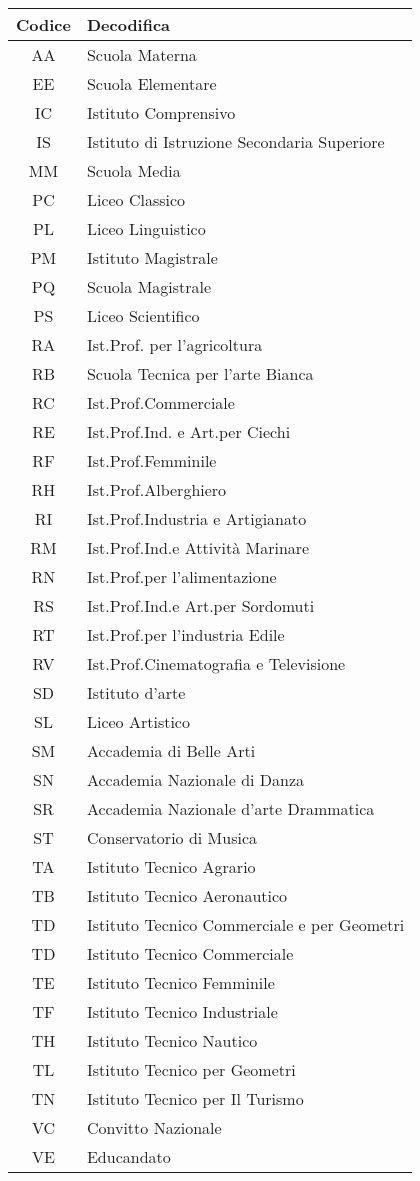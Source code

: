 \begin{center}
	\begin{tabular}{cl}
\toprule
Codice&Decodifica\\
\midrule
AA&Scuola Materna\\
EE&Scuola Elementare\\
IC&Istituto Comprensivo\\
IS&Istituto di Istruzione Secondaria Superiore\\
MM&Scuola Media\\
PC& Liceo Classico\\
PL&Liceo Linguistico\\
PM&Istituto Magistrale\\
PQ&Scuola Magistrale\\
PS& Liceo Scientifico\\
RA&Ist.Prof. per l'agricoltura\\
RB&Scuola Tecnica per l'arte Bianca\\
RC&Ist.Prof.Commerciale\\
RE&Ist.Prof.Ind. e Art.per Ciechi\\
RF&Ist.Prof.Femminile\\
RH&Ist.Prof.Alberghiero\\
RI&Ist.Prof.Industria e Artigianato\\
RM&Ist.Prof.Ind.e Attività Marinare\\
RN&Ist.Prof.per l'alimentazione\\
RS&Ist.Prof.Ind.e Art.per Sordomuti\\
RT&Ist.Prof.per l'industria Edile\\
RV&Ist.Prof.Cinematografia e Televisione\\
SD&Istituto d'arte\\
SL&Liceo Artistico\\
SM&Accademia di Belle Arti\\
SN&Accademia Nazionale di Danza\\
SR&Accademia Nazionale d'arte Drammatica\\
ST&Conservatorio di Musica\\
TA&Istituto Tecnico Agrario\\
TB&Istituto Tecnico Aeronautico\\
TD&Istituto Tecnico Commerciale e per Geometri\\
TD&Istituto Tecnico Commerciale\\
TE&Istituto Tecnico Femminile\\
TF&Istituto Tecnico Industriale\\
TH&Istituto Tecnico Nautico\\
TL&Istituto Tecnico per Geometri\\
TN&Istituto Tecnico per Il Turismo\\
VC&Convitto Nazionale\\
VE&Educandato\\
\bottomrule
\end{tabular}
\end{center}